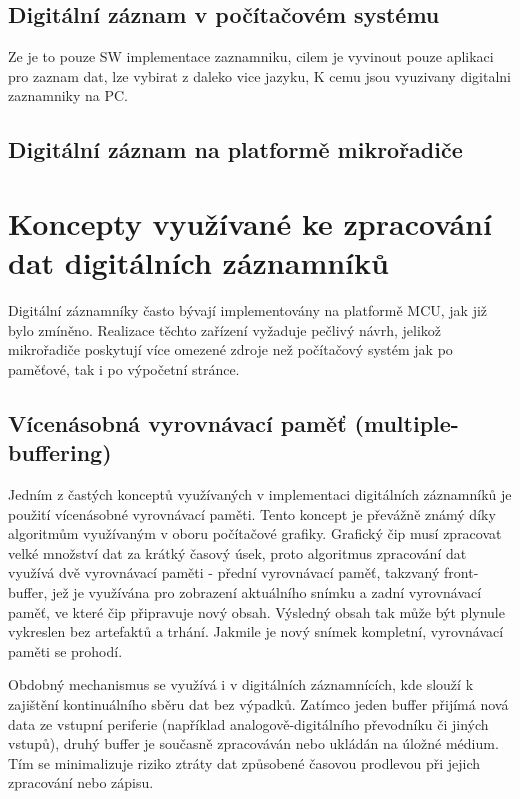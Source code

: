 \subsection{Digitální záznam v počítačovém systému}
Ze je to pouze SW implementace zaznamniku, cilem je vyvinout pouze aplikaci pro zaznam dat, lze vybirat z daleko vice jazyku, K cemu jsou vyuzivany digitalni zaznamniky na PC.

\subsection{Digitální záznam na platformě mikrořadiče}

\section{Koncepty využívané ke zpracování dat digitálních záznamníků}
Digitální záznamníky často bývají implementovány na platformě MCU, jak již bylo zmíněno. Realizace těchto zařízení vyžaduje pečlivý návrh, jelikož mikrořadiče poskytují více omezené zdroje 
než počítačový systém jak po paměťové, tak i po výpočetní stránce. 

\subsection{Vícenásobná vyrovnávací paměť (multiple-buffering)}
Jedním z častých konceptů využívaných v implementaci digitálních záznamníků je použití vícenásobné vyrovnávací paměti. Tento koncept je převážně známý díky algoritmům využívaným v 
oboru počítačové grafiky. Grafický čip musí zpracovat velké množství dat za krátký časový úsek, proto algoritmus zpracování dat využívá dvě vyrovnávací paměti - přední vyrovnávací paměť, 
takzvaný front-buffer, jež je využívána pro zobrazení aktuálního snímku a zadní vyrovnávací paměť, ve které čip připravuje nový obsah. Výsledný obsah tak může být plynule vykreslen 
bez artefaktů a trhání. Jakmile je nový snímek kompletní, vyrovnávací paměti se prohodí. \cite{double_buffering_model}

Obdobný mechanismus se využívá i v digitálních záznamnících, kde slouží k zajištění kontinuálního sběru dat bez výpadků. Zatímco jeden buffer přijímá nová data ze vstupní periferie (například 
analogově-digitálního převodníku či jiných vstupů), druhý buffer je současně zpracováván nebo ukládán na úložné médium. Tím se minimalizuje riziko ztráty dat způsobené časovou prodlevou při 
jejich zpracování nebo zápisu.

